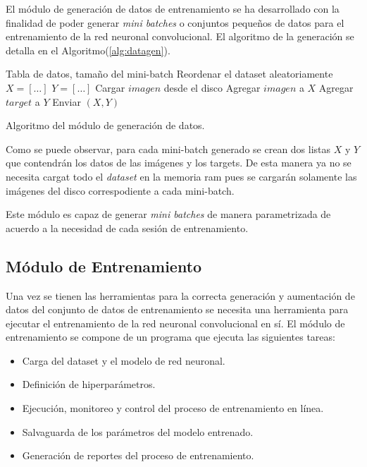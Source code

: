     El módulo de generación de datos de entrenamiento se ha desarrollado con la finalidad de poder generar \textit{mini batches} 
    o conjuntos pequeños de datos para el entrenamiento de la red neuronal convolucional. El algoritmo de la generación se 
    detalla en el Algoritmo(\ref{alg:datagen}).

    \begin{algorithm}
        \begin{algorithmic}[1]
        \REQUIRE Tabla de datos, tamaño del mini-batch
        \STATE Reordenar el dataset aleatoriamente
            \STATE $X = [\dots]$
            \STATE $Y = [\dots]$
                \STATE Cargar $imagen$ desde el disco 
                \STATE Agregar $imagen$ a $X$
                \STATE Agregar $target$ a $Y$
            \ENDFOR
            \STATE Enviar $(X,Y)$
        \ENDFOR
        
        \end{algorithmic}
        \caption{Algoritmo del módulo de generación de datos.}\label{alg:datagen}
    \end{algorithm}

    Como se puede observar, para cada mini-batch generado se crean dos listas $X$ y $Y$ que contendrán los datos de 
    las imágenes y los targets. De esta manera ya no se necesita cargat todo el \textit{dataset} en la memoria ram pues se 
    cargarán solamente las imágenes del disco correspodiente a cada mini-batch.

    Este módulo es capaz de generar \textit{mini batches} de manera parametrizada de acuerdo a la necesidad de cada sesión de 
    entrenamiento.

    \subsection{Módulo de Entrenamiento}
    Una vez se tienen las herramientas para la correcta generación y aumentación de datos del conjunto de datos de entrenamiento 
    se necesita una herramienta para ejecutar el entrenamiento de la red neuronal convolucional en sí. El módulo de entrenamiento 
    se compone de un programa que ejecuta las siguientes tareas:

    \begin{itemize}
        \item Carga del dataset y el modelo de red neuronal.
        \item Definición de hiperparámetros.
        \item Ejecución, monitoreo y control del proceso de entrenamiento en línea. 
        \item Salvaguarda de los parámetros del modelo entrenado.
        \item Generación de reportes del proceso de entrenamiento.
    \end{itemize}

